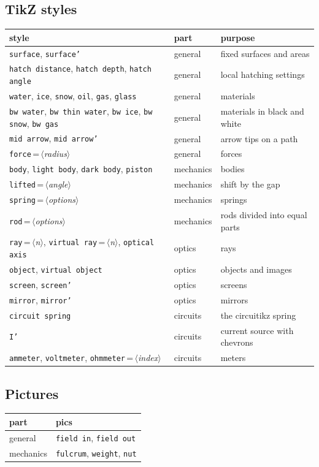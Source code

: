 \documentclass[a4paper,11pt]{article}
\newcommand\pkg[1]{\textsf{#1}}
\newcommand\key[1]{\texttt{#1}}
\newcommand\meta[1]{\ensuremath{\langle}\textit{#1}\ensuremath{\rangle}}
\begin{document}
\subsection{TikZ styles}
\begin{center}\small
\begin{tabular}{lll}
  \toprule
  style & part & purpose \\
  \midrule
  \key{surface}, \key{surface'} & general & fixed surfaces and areas \\
  \key{hatch distance}, \key{hatch depth}, \key{hatch angle} & general & local hatching settings \\
  \key{water}, \key{ice}, \key{snow}, \key{oil}, \key{gas}, \key{glass} & general & materials \\
  \key{bw water}, \key{bw thin water}, \key{bw ice}, \key{bw snow}, \key{bw gas} & general & materials in black and white \\
  \key{mid arrow}, \key{mid arrow'} & general & arrow tips on a path \\
  \key{force}\,=\,\meta{radius} & general & forces \\
  \key{body}, \key{light body}, \key{dark body}, \key{piston} & mechanics & bodies \\
  \key{lifted}\,=\,\meta{angle} & mechanics & shift by the gap \\
  \key{spring}\,=\,\meta{options} & mechanics & springs \\
  \key{rod}\,=\,\meta{options} & mechanics & rods divided into equal parts \\
  \key{ray}\,=\,\meta{n}, \key{virtual ray}\,=\,\meta{n}, \key{optical axis} & optics & rays \\
  \key{object}, \key{virtual object} & optics & objects and images \\
  \key{screen}, \key{screen'} & optics & screens \\
  \key{mirror}, \key{mirror'} & optics & mirrors \\
  \key{circuit spring} & circuits & the \pkg{circuitikz} spring \\
  \key{I'} & circuits & current source with chevrons \\
  \key{ammeter}, \key{voltmeter}, \key{ohmmeter}\,=\,\meta{index} & circuits & meters \\
  \bottomrule
\end{tabular}
\end{center}

\subsection{Pictures}
\begin{center}\small
\begin{tabular}{ll}
  \toprule
  part & pics \\
  \midrule
  general & \texttt{field in}, \texttt{field out} \\
  mechanics & \texttt{fulcrum}, \texttt{weight}, \texttt{nut} \\
  \bottomrule
\end{tabular}
\end{center}
\end{document}

